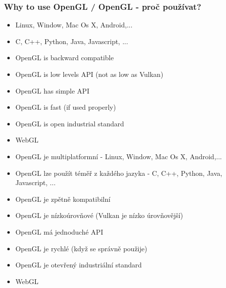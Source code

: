 \begin{frame}\frametitle{Why to use OpenGL / OpenGL - proč používat?}
\scriptsize
\begin{itemize}
  \item{Linux, Window, Mac Os X, Android,...}
  \item{C, C++, Python, Java, Javascript, ...}
  \item{OpenGL is backward compatible}
  \item{OpenGL is low levels API (not as low as Vulkan)}
  \item{OpenGL has simple API}
  \item{OpenGL is fast (if used properly)}
  \item{OpenGL is open industrial standard}
  \item{WebGL}
\end{itemize}

\begin{itemize}
  \item{OpenGL je multiplatformní - Linux, Window, Mac Os X, Android,...}
  \item{OpenGL lze použít téměř z každého jazyka - C, C++, Python, Java, Javascript, ...}
  \item{OpenGL je zpětně kompatibilní}
  \item{OpenGL je nízkoúrovňové (Vulkan je nízko úrovňovější)}
  \item{OpenGL má jednoduché API}
  \item{OpenGL je rychlé (když se správně použije)}
  \item{OpenGL je otevřený industriální standard}
  \item{WebGL}
\end{itemize}
\end{frame}



